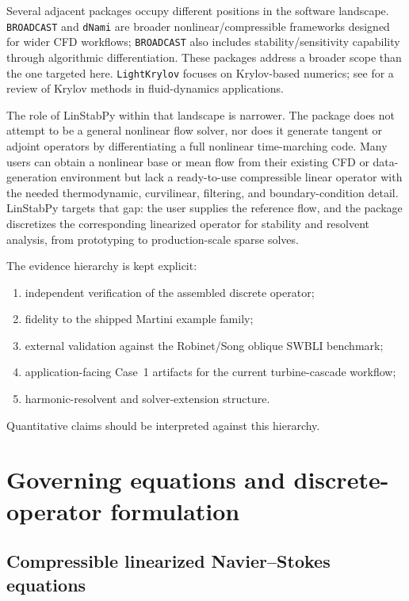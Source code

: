 \documentclass[11pt]{article}
\begin{document}
Several adjacent packages occupy different positions in the software
landscape. \texttt{BROADCAST} \citep{poulain2023broadcast} and
\texttt{dNami} \citep{dnami2022} are broader nonlinear/compressible
frameworks designed for wider CFD workflows; \texttt{BROADCAST} also includes
stability/sensitivity capability through algorithmic differentiation. These
packages address a broader scope than the one targeted here.
\texttt{LightKrylov} \citep{kern2026lightkrylov} focuses on Krylov-based
numerics; see \citet{frantz2023krylov} for a review of Krylov methods in
fluid-dynamics applications.

The role of LinStabPy within that landscape is narrower. The
package does not attempt to be a general nonlinear flow solver, nor does it
generate tangent or adjoint operators by differentiating a full nonlinear
time-marching code. Many users can obtain a nonlinear base or mean
flow from their existing CFD or data-generation environment but lack a
ready-to-use compressible linear operator with the needed thermodynamic,
curvilinear, filtering, and boundary-condition detail. LinStabPy targets that
gap: the user supplies the reference flow, and the package discretizes the
corresponding linearized operator for stability and resolvent analysis, from
prototyping to production-scale sparse solves.

The evidence hierarchy is kept explicit:
\begin{enumerate}[label=\arabic*., nosep]
  \item independent verification of the assembled discrete operator;
  \item fidelity to the shipped Martini example family;
  \item external validation against the Robinet/Song oblique SWBLI benchmark;
  \item application-facing Case~1 artifacts for the current turbine-cascade
    workflow;
  \item harmonic-resolvent and solver-extension structure.
\end{enumerate}
Quantitative claims should be interpreted against this hierarchy.

\section{Governing equations and discrete-operator formulation}
\label{sec:equations}

\subsection{Compressible linearized Navier--Stokes equations}
\label{sec:lnse}
\end{document}
